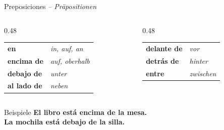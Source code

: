 \documentclass[aspectratio=169, 11pt]{beamer}
\newcommand{\de}[1]{{\small\textcolor{dunkelgrau}{\textit{#1}}}}
\newcommand{\estar}[1]{\textbf{\textcolor{blau}{#1}}}
\begin{document}
\begin{frame}{Preposiciones \de{-- Präpositionen}}

\begin{columns}[T]
\begin{column}{0.48\textwidth}
\begin{tabular}{@{}ll@{}}
\estar{en} & \de{in, auf, an} \\[0.6em]
\estar{encima de} & \de{auf, oberhalb} \\[0.6em]
\estar{debajo de} & \de{unter} \\[0.6em]
\estar{al lado de} & \de{neben} \\
\end{tabular}
\end{column}

\begin{column}{0.48\textwidth}
\begin{tabular}{@{}ll@{}}
\estar{delante de} & \de{vor} \\[0.6em]
\estar{detrás de} & \de{hinter} \\[0.6em]
\estar{entre} & \de{zwischen} \\
\end{tabular}
\end{column}
\end{columns}

\vspace{0.8cm}

\begin{block}{Beispiele}
\estar{El libro está \textbf{encima de} la mesa.}\\
\estar{La mochila está \textbf{debajo de} la silla.}
\end{block}

\end{frame}
\end{document}

